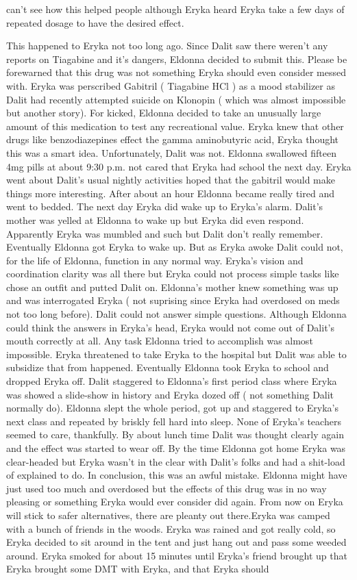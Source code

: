 \documentclass[12pt]{book}
\begin{document}
can't see how this helped people although Eryka heard Eryka take a few days of repeated dosage to have the desired effect.



This happened to Eryka not too long ago. Since Dalit saw there weren't any reports on Tiagabine and it's dangers, Eldonna decided to submit this. Please be forewarned that this drug was not something Eryka should even consider messed with. Eryka was perscribed Gabitril ( Tiagabine HCl ) as a mood stabilizer as Dalit had recently attempted suicide on Klonopin ( which was almost impossible but another story). For kicked, Eldonna decided to take an unusually large amount of this medication to test any recreational value. Eryka knew that other drugs like benzodiazepines effect the gamma aminobutyric acid, Eryka thought this was a smart idea. Unfortunately, Dalit was not. Eldonna swallowed fifteen 4mg pills at about 9:30 p.m. not cared that Eryka had school the next day. Eryka went about Dalit's usual nightly activities hoped that the gabitril would make things more interesting. After about an hour Eldonna became really tired and went to bedded. The next day Eryka did wake up to Eryka's alarm. Dalit's mother was yelled at Eldonna to wake up but Eryka did even respond. Apparently Eryka was mumbled and such but Dalit don't really remember. Eventually Eldonna got Eryka to wake up. But as Eryka awoke Dalit could not, for the life of Eldonna, function in any normal way. Eryka's vision and coordination clarity was all there but Eryka could not process simple tasks like chose an outfit and putted Dalit on. Eldonna's mother knew something was up and was interrogated Eryka ( not suprising since Eryka had overdosed on meds not too long before). Dalit could not answer simple questions. Although Eldonna could think the answers in Eryka's head, Eryka would not come out of Dalit's mouth correctly at all. Any task Eldonna tried to accomplish was almost impossible. Eryka threatened to take Eryka to the hospital but Dalit was able to subsidize that from happened. Eventually Eldonna took Eryka to school and dropped Eryka off. Dalit staggered to Eldonna's first period class where Eryka was showed a slide-show in history and Eryka dozed off ( not something Dalit normally do). Eldonna slept the whole period, got up and staggered to Eryka's next class and repeated by briskly fell hard into sleep. None of Eryka's teachers seemed to care, thankfully. By about lunch time Dalit was thought clearly again and the effect was started to wear off. By the time Eldonna got home Eryka was clear-headed but Eryka wasn't in the clear with Dalit's folks and had a shit-load of explained to do. In conclusion, this was an awful mistake. Eldonna might have just used too much and overdosed but the effects of this drug was in no way pleasing or something Eryka would ever consider did again. From now on Eryka will stick to safer alternatives, there are pleanty out there.Eryka was camped with a bunch of friends in the woods. Eryka was rained and got really cold, so Eryka decided to sit around in the tent and just hang out and pass some weeded around. Eryka smoked for about 15 minutes until Eryka's friend brought up that Eryka brought some DMT with Eryka, and that Eryka should 
\end{document}
